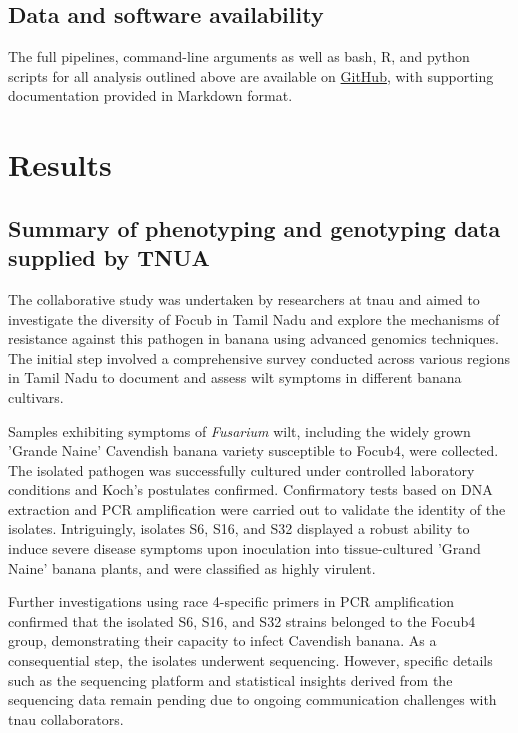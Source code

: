 \subsection{Data and software availability}

The full pipelines, command-line arguments as well as bash, R, and python scripts for all analysis outlined above are available on \href{https://github.com/JamiePike/NewTools-Project}{GitHub}, with supporting documentation provided in Markdown format.

\newpage

\section{Results}
\subsection{Summary of phenotyping and genotyping data supplied by TNUA}

The collaborative study was undertaken by researchers at \acs{tnau} and aimed to investigate the diversity of \ac{Focub} in Tamil Nadu and explore the mechanisms of resistance against this pathogen in banana using advanced genomics techniques. The initial step involved a comprehensive survey conducted across various regions in Tamil Nadu to document and assess wilt symptoms in different banana cultivars.

Samples exhibiting symptoms of \textit{Fusarium} wilt, including the widely grown 'Grande Naine' Cavendish banana variety susceptible to \acs{Focub4}, were collected. The isolated pathogen was successfully cultured under controlled laboratory conditions and Koch's postulates confirmed. Confirmatory tests based on DNA extraction and PCR amplification were carried out to validate the identity of the isolates. Intriguingly,  isolates S6, S16, and S32 displayed a robust ability to induce severe disease symptoms upon inoculation into tissue-cultured 'Grand Naine' banana plants, and were classified as highly virulent.

Further investigations using race 4-specific primers in PCR amplification confirmed that the isolated S6, S16, and S32 strains belonged to the \acs{Focub4} group, demonstrating their capacity to infect Cavendish banana. As a consequential step, the isolates underwent sequencing. However, specific details such as the sequencing platform and statistical insights derived from the sequencing data remain pending due to ongoing communication challenges with \ac{tnau} collaborators.

